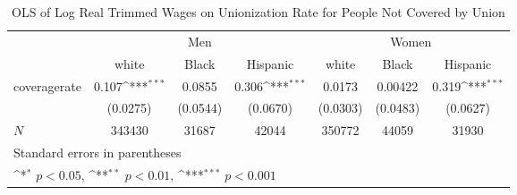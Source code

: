 \begin{table}[htbp]\centering
\def\sym#1{\ifmmode^{#1}\else\(^{#1}\)\fi}
\caption{OLS of Log Real Trimmed Wages on Unionization Rate for People Not Covered by Union}
\begin{tabular}{l*{6}{c}}
\hline\hline
            &\multicolumn{3}{c}{Men}                                          &\multicolumn{3}{c}{Women}                                        \\\cmidrule(lr){2-4}\cmidrule(lr){5-7}
            &\multicolumn{1}{c}{white}&\multicolumn{1}{c}{Black}&\multicolumn{1}{c}{Hispanic}&\multicolumn{1}{c}{white}&\multicolumn{1}{c}{Black}&\multicolumn{1}{c}{Hispanic}\\
\hline
coveragerate&       0.107\sym{***}&      0.0855         &       0.306\sym{***}&      0.0173         &     0.00422         &       0.319\sym{***}\\
            &    (0.0275)         &    (0.0544)         &    (0.0670)         &    (0.0303)         &    (0.0483)         &    (0.0627)         \\
\hline
\(N\)       &      343430         &       31687         &       42044         &      350772         &       44059         &       31930         \\
\hline\hline
\multicolumn{7}{l}{\footnotesize Standard errors in parentheses}\\
\multicolumn{7}{l}{\footnotesize \sym{*} \(p<0.05\), \sym{**} \(p<0.01\), \sym{***} \(p<0.001\)}\\
\end{tabular}
\end{table}
